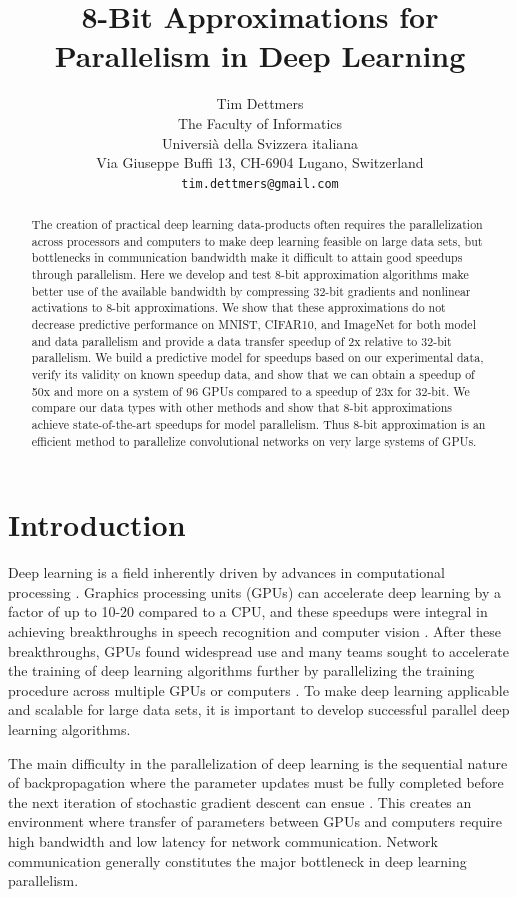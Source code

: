 \documentclass{article} %
\title{8-Bit Approximations for Parallelism in Deep Learning}
\author{Tim Dettmers \\
The Faculty of Informatics\\
Universià della Svizzera italiana\\
Via Giuseppe Buffi 13, CH-6904 Lugano, Switzerland \\
\texttt{tim.dettmers@gmail.com} 
}
\begin{document}
\maketitle

\begin{abstract}
The creation of practical deep learning data-products often requires the parallelization across processors and computers to make deep learning feasible on large data sets, but bottlenecks in communication bandwidth make it difficult to attain good speedups through parallelism. Here we develop and test 8-bit approximation algorithms make better use of the available bandwidth by compressing 32-bit gradients and nonlinear activations to 8-bit approximations. We show that these approximations do not decrease predictive performance on MNIST, CIFAR10, and ImageNet for both model and data parallelism and provide a data transfer speedup of 2x relative to 32-bit parallelism. We build a predictive model for speedups based on our experimental data, verify its validity on known speedup data, and show that we can obtain a speedup of 50x and more on a system of 96 GPUs compared to a speedup of 23x for 32-bit. We compare our data types with other methods and show that 8-bit approximations achieve state-of-the-art speedups for model parallelism. Thus 8-bit approximation is an efficient method to parallelize convolutional networks on very large systems of GPUs.
\end{abstract}

\section{Introduction}
Deep learning is a field inherently driven by advances in computational processing \citep{schmidhuber2015deep}. Graphics processing units (GPUs) can accelerate deep learning by a factor of up to 10-20 compared to a CPU, and these speedups were integral in achieving breakthroughs in speech recognition and computer vision \citep{ciresan2012multi, dahl2012context,krizhevsky2012imagenet}. After these breakthroughs, GPUs found widespread use and many teams sought to accelerate the training of deep learning algorithms further by parallelizing the training procedure across multiple GPUs or computers \citep{chilimbi2014project,coates2013deep,dean2012large,wu2015deep}. To make deep learning applicable and scalable for large data sets, it is important to develop successful parallel deep learning algorithms.

The main difficulty in the parallelization of deep learning is the sequential nature of backpropagation where the parameter updates must be fully completed before the next iteration of stochastic gradient descent can ensue \citep{rumelhart1988learning}. This creates an environment where transfer of parameters between GPUs and computers require high bandwidth and low latency for network communication. Network communication generally constitutes the major bottleneck in deep learning parallelism.
\end{document}

